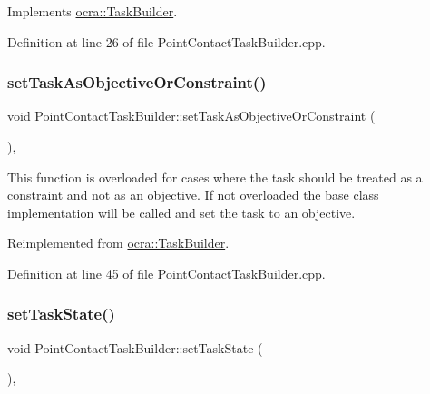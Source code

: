 Implements \hyperlink{classocra_1_1TaskBuilder_a7a2c8bcc5d95160d0e48806a2648f1a5}{ocra\+::\+Task\+Builder}.



Definition at line 26 of file Point\+Contact\+Task\+Builder.\+cpp.

\hypertarget{classocra_1_1PointContactTaskBuilder_a729f50dc73c00accb86a9480cb3054fd}{}\label{classocra_1_1PointContactTaskBuilder_a729f50dc73c00accb86a9480cb3054fd} 
\subsubsection{\texorpdfstring{set\+Task\+As\+Objective\+Or\+Constraint()}{setTaskAsObjectiveOrConstraint()}}
{\footnotesize\ttfamily void Point\+Contact\+Task\+Builder\+::set\+Task\+As\+Objective\+Or\+Constraint (\begin{DoxyParamCaption}{ }\end{DoxyParamCaption})\hspace{0.3cm}{\ttfamily [protected]}, {\ttfamily [virtual]}}

This function is overloaded for cases where the task should be treated as a constraint and not as an objective. If not overloaded the base class implementation will be called and set the task to an objective. 

Reimplemented from \hyperlink{classocra_1_1TaskBuilder_a9e7588983e3adf7f706d122a75e84d05}{ocra\+::\+Task\+Builder}.



Definition at line 45 of file Point\+Contact\+Task\+Builder.\+cpp.

\hypertarget{classocra_1_1PointContactTaskBuilder_a073506c0c849ad4ebd40aebef37f280d}{}\label{classocra_1_1PointContactTaskBuilder_a073506c0c849ad4ebd40aebef37f280d} 
\subsubsection{\texorpdfstring{set\+Task\+State()}{setTaskState()}}
{\footnotesize\ttfamily void Point\+Contact\+Task\+Builder\+::set\+Task\+State (\begin{DoxyParamCaption}{ }\end{DoxyParamCaption})\hspace{0.3cm}{\ttfamily [protected]}, {\ttfamily [virtual]}}



